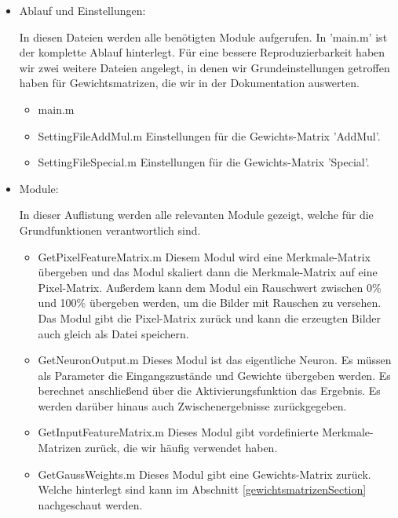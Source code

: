 \begin{itemize}
	\item Ablauf und Einstellungen:
	
	In diesen Dateien werden alle benötigten Module aufgerufen. In 'main.m' ist der komplette Ablauf hinterlegt. Für eine bessere Reproduzierbarkeit haben wir zwei weitere Dateien angelegt, in denen wir Grundeinstellungen getroffen haben für Gewichtsmatrizen, die wir in der Dokumentation auswerten.
	
	\begin{itemize}
		\item main.m
		\item SettingFileAddMul.m
		Einstellungen für die Gewichts-Matrix 'AddMul'.
		
		\item SettingFileSpecial.m
		Einstellungen für die Gewichts-Matrix 'Special'.
		
	\end{itemize}
	
	\item Module:
	
	In dieser Auflistung werden alle relevanten Module gezeigt, welche für die Grundfunktionen verantwortlich sind.
	
	\begin{itemize}
		\item GetPixelFeatureMatrix.m
		Diesem Modul wird eine Merkmale-Matrix übergeben und das Modul skaliert dann die Merkmale-Matrix auf eine Pixel-Matrix. Außerdem kann dem Modul ein Rauschwert zwischen 0\% und 100\% übergeben werden, um die Bilder mit Rauschen zu versehen. Das Modul gibt die Pixel-Matrix zurück und kann die erzeugten Bilder auch gleich als Datei speichern.
		
		\item GetNeuronOutput.m
		Dieses Modul ist das eigentliche Neuron. Es müssen als Parameter die Eingangszustände und Gewichte übergeben werden. Es berechnet anschließend über die Aktivierungsfunktion das Ergebnis. Es werden darüber hinaus auch Zwischenergebnisse zurückgegeben.
		
		\item GetInputFeatureMatrix.m
		Dieses Modul gibt vordefinierte Merkmale-Matrizen zurück, die wir häufig verwendet haben.
		
		\item GetGaussWeights.m
		Dieses Modul gibt eine Gewichts-Matrix zurück. Welche hinterlegt sind kann im Abschnitt \ref{gewichtsmatrizenSection} nachgeschaut werden.
		

\end{itemize}
\end{itemize}
